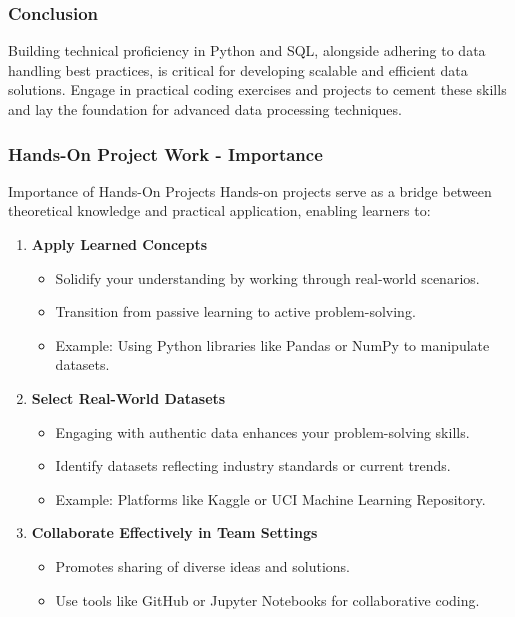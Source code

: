 \documentclass[aspectratio=169]{beamer}
\begin{document}
\begin{frame}
  \frametitle{Conclusion}
  Building technical proficiency in Python and SQL, alongside adhering to data handling best practices, is critical for developing scalable and efficient data solutions. Engage in practical coding exercises and projects to cement these skills and lay the foundation for advanced data processing techniques.
\end{frame}

\begin{frame}[fragile]
    \frametitle{Hands-On Project Work - Importance}
    \begin{block}{Importance of Hands-On Projects}
        Hands-on projects serve as a bridge between theoretical knowledge and practical application, enabling learners to:
    \end{block}
    \begin{enumerate}
        \item \textbf{Apply Learned Concepts}
        \begin{itemize}
            \item Solidify your understanding by working through real-world scenarios.
            \item Transition from passive learning to active problem-solving.
            \item Example: Using Python libraries like Pandas or NumPy to manipulate datasets.
        \end{itemize}
        
        \item \textbf{Select Real-World Datasets}
        \begin{itemize}
            \item Engaging with authentic data enhances your problem-solving skills.
            \item Identify datasets reflecting industry standards or current trends.
            \item Example: Platforms like Kaggle or UCI Machine Learning Repository.
        \end{itemize}
        
        \item \textbf{Collaborate Effectively in Team Settings}
        \begin{itemize}
            \item Promotes sharing of diverse ideas and solutions.
            \item Use tools like GitHub or Jupyter Notebooks for collaborative coding.
        \end{itemize}
    \end{enumerate}
\end{frame}
\end{document}
